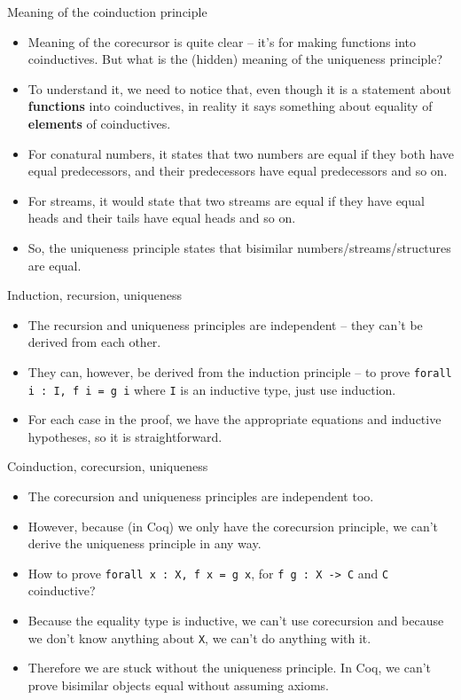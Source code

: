 \documentclass{beamer}
\begin{document}
\begin{frame}{Meaning of the coinduction principle}
\begin{itemize}
	\item Meaning of the corecursor is quite clear -- it's for making functions into coinductives. But what is the (hidden) meaning of the uniqueness principle?
	\item To understand it, we need to notice that, even though it is a statement about \textbf{functions} into coinductives, in reality it says something about equality of \textbf{elements} of coinductives.
	\item For conatural numbers, it states that two numbers are equal if they both have equal predecessors, and their predecessors have equal predecessors and so on.
	\item For streams, it would state that two streams are equal if they have equal heads and their tails have equal heads and so on.
	\item So, the uniqueness principle states that bisimilar numbers/streams/structures are equal.
\end{itemize}
\end{frame}

\begin{frame}{Induction, recursion, uniqueness}
\begin{itemize}
	\item The recursion and uniqueness principles are independent -- they can't be derived from each other.
	\item They can, however, be derived from the induction principle -- to prove \texttt{forall i : I, f i = g i} where \texttt{I} is an inductive type, just use induction.
	\item For each case in the proof, we have the appropriate equations and inductive hypotheses, so it is straightforward.
\end{itemize}
\end{frame}

\begin{frame}{Coinduction, corecursion, uniqueness}
\begin{itemize}
	\item The corecursion and uniqueness principles are independent too.
	\item However, because (in Coq) we only have the corecursion principle, we can't derive the uniqueness principle in any way.
	\item How to prove \texttt{forall x : X, f x = g x}, for \texttt{f g : X -> C} and \texttt{C} coinductive?
	\item Because the equality type is inductive, we can't use corecursion and because we don't know anything about \texttt{X}, we can't do anything with it.
	\item Therefore we are stuck without the uniqueness principle. In Coq, we can't prove bisimilar objects equal without assuming axioms.
\end{itemize}
\end{frame}
\end{document}
